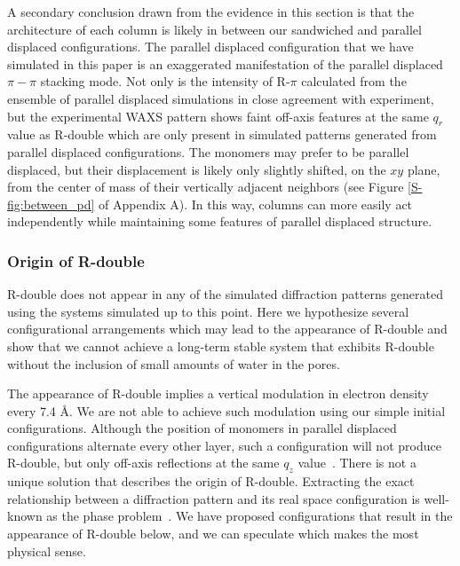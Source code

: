   A secondary conclusion drawn from the evidence in this section is 
  that the architecture of each column is likely in between our sandwiched
  and parallel displaced configurations. The parallel displaced configuration 
  that we have simulated in this paper is an exaggerated manifestation of the 
  parallel displaced $\pi-\pi$ stacking mode. Not only is the intensity of R-$\pi$
  calculated from the ensemble of parallel displaced simulations in close agreement
  with experiment, but the experimental WAXS pattern shows faint off-axis features
  at the same $q_r$ value as R-double which are only present in simulated patterns
  generated from parallel displaced configurations. The monomers may prefer to be
  parallel displaced, but their displacement is likely only slightly shifted, on 
  the $xy$ plane, from the center of mass of their vertically adjacent neighbors 
  (see Figure \ref{S-fig:between_pd} of Appendix A). In this way,
  columns can more easily act 
  independently while maintaining some features of parallel displaced structure. 

  \subsubsection{Origin of R-double}\label{section:rdouble}
  
  R-double does not appear in any of the simulated diffraction patterns
  generated using the systems simulated up to this point. Here we hypothesize 
  several configurational arrangements which may lead to the appearance of R-double and
  show that we cannot achieve a long-term stable system that exhibits R-double
  without the inclusion of small amounts of water in the pores.
  
  The appearance of R-double implies a vertical modulation in electron density
  every 7.4 \AA. We are not able to achieve such modulation using our simple
  initial configurations. Although the position of monomers in parallel displaced
  configurations alternate every other layer, such a configuration will not
  produce R-double, but only off-axis reflections at the same $q_z$
  value~\cite{harburn_atlas_1975}. There is not a unique solution that describes
  the origin of R-double. Extracting the exact relationship between a diffraction
  pattern and its real space configuration is well-known as the phase
  problem~\cite{taylor_phase_2003}. We have proposed configurations that
  result in the appearance of R-double below, and we can speculate which makes
  the most physical sense. 
  

